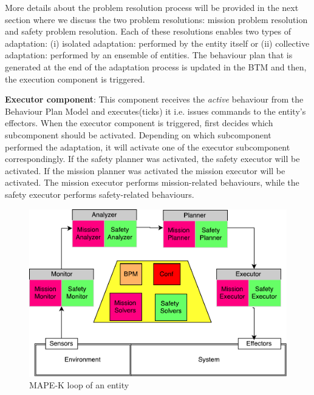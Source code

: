 \documentclass[journal]{IEEEtran}
\theoremstyle{definition}
\newcommand\darko[1]{\nb{Darko}{#1}}
\newcommand\patrizio[1]{\nb{Patrizio}{#1}}
\begin{document}

More details about the problem resolution process will be provided in the next section where we discuss the two problem resolutions: mission problem resolution and safety problem resolution. Each of these resolutions enables two types of adaptation: (i) isolated adaptation: performed by the entity itself or (ii)  collective adaptation: performed by an ensemble of entities. The behaviour plan that is generated at the end of the adaptation process is updated in the BTM and then, the execution component is triggered.

\textbf{Executor component}: This component receives   the \textit{active} behaviour from the Behaviour Plan Model and executes(ticks) it i.e. issues commands to the entity's effectors.
When the executor component is triggered, first decides which subcomponent should be activated. Depending on which subcomponent performed the adaptation, it will activate one of the executor subcomponent correspondingly.  
If the safety planner was activated, the safety executor will be activated. If the mission planner was activated the mission executor will be activated. The mission executor performs mission-related behaviours, while the safety executor performs safety-related behaviours.









\begin{figure}[h]
\includegraphics[width=.5\textwidth]{Figures/MAPE-K_Entity.pdf}
\caption{MAPE-K loop of an entity }\label{fig:agentsArchitecture}
\end{figure}
\end{document}
